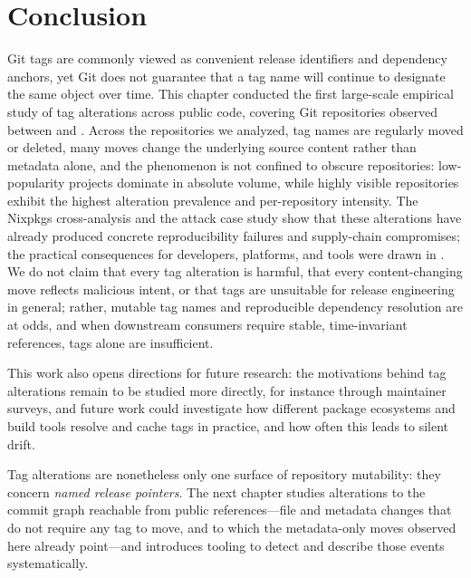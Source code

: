 \section{Conclusion}
\label{sec:tags-conclusion}

Git tags are commonly viewed as convenient release identifiers and dependency anchors, yet Git does not guarantee that a tag name will continue to designate the same object over time.
This chapter conducted the first large-scale empirical study of tag alterations across public code, covering \TotalOriginsAnalyzedShort Git repositories observed between \CutoffDate and \DatasetDate.
Across the repositories we analyzed, tag names are regularly moved or deleted, many moves change the underlying source content rather than metadata alone, and the phenomenon is not confined to obscure repositories: low-popularity projects dominate in absolute volume, while highly visible repositories exhibit the highest alteration prevalence and per-repository intensity.
The Nixpkgs cross-analysis and the attack case study show that these alterations have already produced concrete reproducibility failures and supply-chain compromises; the practical consequences for developers, platforms, and tools were drawn in .
We do not claim that every tag alteration is harmful, that every content-changing move reflects malicious intent, or that tags are unsuitable for release engineering in general; rather, mutable tag names and reproducible dependency resolution are at odds, and when downstream consumers require stable, time-invariant references, tags alone are insufficient.

This work also opens directions for future research: the motivations behind tag alterations remain to be studied more directly, for instance through maintainer surveys, and future work could investigate how different package ecosystems and build tools resolve and cache tags in practice, and how often this leads to silent drift.

Tag alterations are nonetheless only one surface of repository mutability: they concern \emph{named release pointers}.
The next chapter studies alterations to the commit graph reachable from public references---file and metadata changes that do not require any tag to move, and to which the metadata-only moves observed here already point---and introduces tooling to detect and describe those events systematically.
